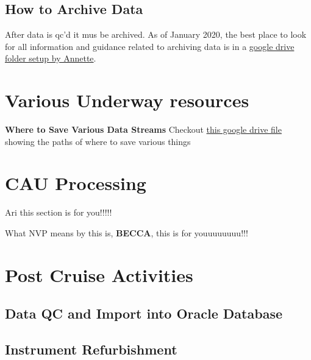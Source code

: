 \documentclass[]{book}
\begin{document}
\section{How to Archive Data}\label{how-to-archive-data}

After data is qc'd it mus be archived. As of January 2020, the best
place to look for all information and guidance related to archiving data
is in a
\href{https://drive.google.com/drive/folders/1Oq76hN6eOhhJOevwZiO0nX4Gtf0tiJrp}{google
drive folder setup by Annette}.

\chapter{Various Underway resources}\label{various-underway-resources}

\textbf{Where to Save Various Data Streams} Checkout
\href{https://docs.google.com/spreadsheets/d/16l1OQgGEunLoADh_MEGyIfbQL2w0u6aw/edit\#gid=1675337307}{this
google drive file} showing the paths of where to save various things

\chapter{CAU Processing}\label{cau}

Ari this section is for you!!!!!

What NVP means by this is, \textbf{BECCA}, this is for youuuuuuuu!!!

\chapter{Post Cruise Activities}\label{postcruise}

\section{Data QC and Import into Oracle
Database}\label{data-qc-and-import-into-oracle-database}

\section{Instrument Refurbishment}\label{instrument-refurbishment}
\end{document}
